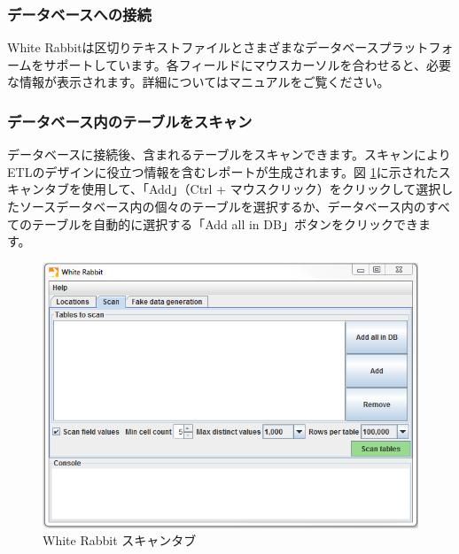 \documentclass[
  11pt]{book}
\theoremstyle{definition}
\theoremstyle{definition}
\theoremstyle{definition}
\theoremstyle{definition}
\theoremstyle{remark}
\begin{document}
\subsubsection*{データベースへの接続}\label{ux30c7ux30fcux30bfux30d9ux30fcux30b9ux3078ux306eux63a5ux7d9a}

White Rabbitは区切りテキストファイルとさまざまなデータベースプラットフォームをサポートしています。各フィールドにマウスカーソルを合わせると、必要な情報が表示されます。詳細についてはマニュアルをご覧ください。

\subsubsection*{データベース内のテーブルをスキャン}\label{ux30c7ux30fcux30bfux30d9ux30fcux30b9ux5185ux306eux30c6ux30fcux30d6ux30ebux3092ux30b9ux30adux30e3ux30f3}

データベースに接続後、含まれるテーブルをスキャンできます。スキャンによりETLのデザインに役立つ情報を含むレポートが生成されます。図 \ref{fig:WhiteRabbitAddTables}に示されたスキャンタブを使用して、「Add」（Ctrl + マウスクリック）をクリックして選択したソースデータベース内の個々のテーブルを選択するか、データベース内のすべてのテーブルを自動的に選択する「Add all in DB」ボタンをクリックできます。

\begin{figure}

{\centering \includegraphics[width=1\linewidth]{images/ExtractTransformLoad/WhiteRabbitAddTables} 

}

\caption{White Rabbit スキャンタブ}\label{fig:WhiteRabbitAddTables}
\end{figure}
\end{document}
